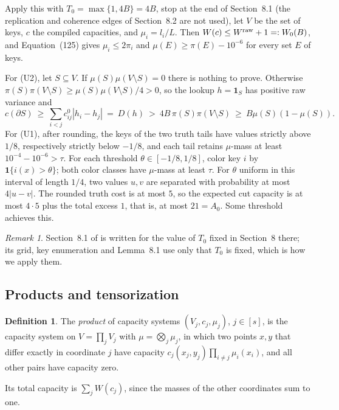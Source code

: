 \documentclass[11pt,letterpaper]{article}
\theoremstyle{definition}
\newtheorem{definition}[theorem]{Definition}
\theoremstyle{remark}
\newtheorem{remark}[theorem]{Remark}
\newcommand{\ind}{\mathbf 1}
\begin{document}
Apply this with \(T_0=\max\{1,4B\}=4B\), stop at the end of Section~8.1
(the replication and coherence edges of Section~8.2 are not used), let
\(V\) be the set of keys, \(c\) the compiled capacities, and
\(\mu_i=l_i/L\). Then \(W(c)\le W^{\rm raw}+1=:W_0(B)\), and Equation~(125)
gives \(\mu_i\le2\pi_i\) and \(\mu(E)\ge\pi(E)-10^{-6}\) for every set
\(E\) of keys.

For (U2), let \(S\subseteq V\). If \(\mu(S)\mu(V\setminus S)=0\) there is
nothing to prove. Otherwise \(\pi(S)\pi(V\setminus S)\ge\mu(S)\mu(V\setminus
S)/4>0\), so the lookup \(h=\ind_S\) has positive raw variance and
\[
c(\partial S)\ \ge\ \sum_{i<j}c^0_{ij}|h_i-h_j|\ =\ D(h)\ >\ 4B\,\pi(S)\pi(V\setminus S)
\ \ge\ B\mu(S)(1-\mu(S)).
\]
For (U1), after rounding, the keys of the two truth tails have values
strictly above \(1/8\), respectively strictly below \(-1/8\), and each tail
retains \(\mu\)-mass at least \(10^{-4}-10^{-6}>\tau\). For each threshold
\(\theta\in[-1/8,1/8]\), color key \(i\) by \(\ind\{i(x)>\theta\}\); both
color classes have \(\mu\)-mass at least \(\tau\). For \(\theta\) uniform in
this interval of length \(1/4\), two values \(u,v\) are separated with
probability at most \(4|u-v|\). The rounded truth cost is at most \(5\), so
the expected cut capacity is at most \(4\cdot5\) plus the total excess
\(1\), that is, at most \(21=A_0\). Some threshold achieves this.

\begin{remark}
Section~8.1 of \cite{oai26} is written for the value of \(T_0\) fixed in
Section~8 there; its grid, key enumeration and Lemma~8.1 use only that
\(T_0\) is fixed, which is how we apply them.
\end{remark}

\subsection{Products and tensorization}

\begin{definition}
The \emph{product} of capacity systems \((V_j,c_j,\mu_j)\), \(j\in[s]\), is
the capacity system on \(V=\prod_jV_j\) with \(\mu=\bigotimes_j\mu_j\), in
which two points \(x,y\) that differ exactly in coordinate \(j\) have
capacity \(c_j(x_j,y_j)\prod_{i\ne j}\mu_i(x_i)\), and all other pairs have
capacity zero.
\end{definition}

Its total capacity is \(\sum_jW(c_j)\), since the masses of the other
coordinates sum to one.
\end{document}
